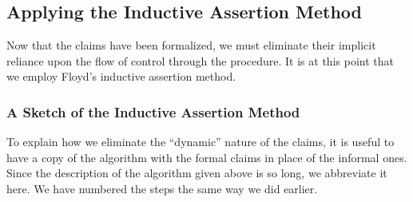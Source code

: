 \documentclass[11pt]{book}
\newcommand{\pubdefaulttextsize}{\large}
\begin{document}
\subsection{Applying the Inductive Assertion Method}
\pubdefaulttextsize
Now that the claims have been formalized, we must eliminate their
implicit reliance upon the flow of control through the procedure.
It is at this point that we employ Floyd's inductive assertion method.
\subsubsection{A Sketch of the Inductive Assertion Method}
\pubdefaulttextsize
To explain how we eliminate the ``dynamic'' nature of the claims,
it is useful to have a copy of the algorithm
with the formal claims in place of the informal ones.  Since the
description of the algorithm given above
is so long, we 
abbreviate it here.  We have numbered the steps the same
way we did earlier.
\end{document}
